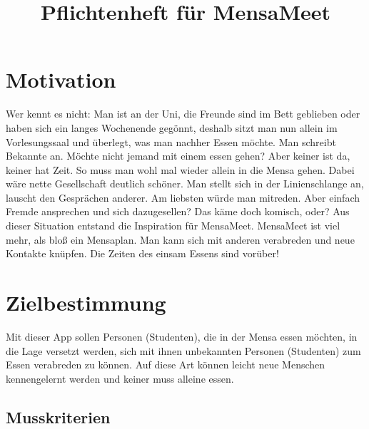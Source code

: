 \documentclass[a4paper]{scrreprt}
\begin{document}
\title{Pflichtenheft für MensaMeet}

\maketitle
 
\tableofcontents

\chapter{Motivation}

Wer kennt es nicht: Man ist an der Uni, die Freunde sind im Bett geblieben oder haben sich ein langes Wochenende gegönnt, deshalb sitzt man nun allein im Vorlesungssaal und überlegt, was man nachher Essen möchte. Man schreibt Bekannte an. Möchte nicht jemand mit einem essen gehen? Aber keiner ist da, keiner hat Zeit. So muss man wohl mal wieder allein in die Mensa gehen. Dabei wäre nette Gesellschaft deutlich schöner. Man stellt sich in der Linienschlange an, lauscht den Gesprächen anderer. Am liebsten würde man mitreden. Aber einfach Fremde ansprechen und sich dazugesellen? Das käme doch komisch, oder? Aus dieser Situation entstand die Inspiration für MensaMeet. MensaMeet ist viel mehr, als bloß ein Mensaplan. Man kann sich mit anderen verabreden und neue Kontakte knüpfen. Die Zeiten des einsam Essens sind vorüber!

\chapter{Zielbestimmung}
Mit dieser App sollen Personen (Studenten), die in der Mensa essen möchten, in die Lage versetzt werden, sich mit ihnen unbekannten Personen (Studenten) zum Essen verabreden zu können. Auf diese Art können leicht neue Menschen kennengelernt werden und keiner muss alleine essen.
 
\section{Musskriterien}
\end{document}
